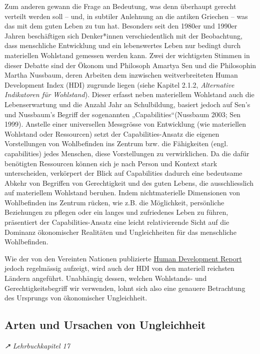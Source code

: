 \documentclass[
  nswissgerman,
  a4paper,
  DIV=11,
  numbers=noendperiod,
  oneside,
  openany]{scrreprt}
\begin{document}
Zum anderen gewann die Frage an Bedeutung, was denn überhaupt gerecht
verteilt werden soll -- und, in subtiler Anlehnung an die antiken
Griechen -- was das mit dem guten Leben zu tun hat. Besonders seit den
1980er und 1990er Jahren beschäftigen sich Denker*innen verschiedentlich
mit der Beobachtung, dass menschliche Entwicklung und ein lebenswertes
Leben nur bedingt durch materiellen Wohlstand gemessen werden kann. Zwei
der wichtigsten Stimmen in dieser Debatte sind der Ökonom und Philosoph
Amartya Sen und die Philosophin Martha Nussbaum, deren Arbeiten dem
inzwischen weitverbreiteten Human Development Index (HDI) zugrunde
liegen (siehe Kapitel 2.1.2, \emph{Alternative Indikatoren für
Wohlstand}). Dieser erfasst neben materiellem Wohlstand auch die
Lebenserwartung und die Anzahl Jahr an Schulbildung, basiert jedoch auf
Sen's und Nussbaum's Begriff der sogenannten „Capabilities``(Nussbaum
2003; Sen 1999). Anstelle einer universellen Messgrösse von Entwicklung
(wie materiellen Wohlstand oder Ressourcen) setzt der
Capabilities-Ansatz die eigenen Vorstellungen von Wohlbefinden ins
Zentrum bzw. die Fähigkeiten (engl. capabilities) jedes Menschen, diese
Vorstellungen zu verwirklichen. Da die dafür benötigten Ressourcen
können sich je nach Person und Kontext stark unterscheiden, verkörpert
der Blick auf Capabilities dadurch eine bedeutsame Abkehr von Begriffen
von Gerechtigkeit und des guten Lebens, die ausschliesslich auf
materiellem Wohlstand beruhen. Indem nichtmaterielle Dimensionen von
Wohlbefinden ins Zentrum rücken, wie z.B. die Möglichkeit, persönliche
Beziehungen zu pflegen oder ein langes und zufriedenes Leben zu führen,
präsentiert der Capabilities-Ansatz eine leicht relativierende Sicht auf
die Dominanz ökonomischer Realitäten und Ungleichheiten für das
menschliche Wohlbefinden.

Wie der von den Vereinten Nationen publizierte
\href{https://hdr.undp.org/content/human-development-report-2025}{Human
Development Report} jedoch regelmässig aufzeigt, wird auch der HDI von
den materiell reichsten Ländern angeführt. Unabhängig dessen, welchen
Wohlstands- und Gerechtigkeitsbegriff wir verwenden, lohnt sich also
eine genauere Betrachtung des Ursprungs von ökonomischer Ungleichheit.

\subsection{Arten und Ursachen von
Ungleichheit}\label{arten-und-ursachen-von-ungleichheit}

\emph{↗ Lehrbuchkapitel 17}
\end{document}
